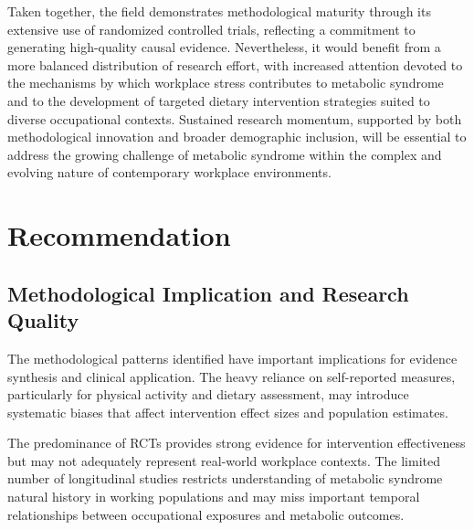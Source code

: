 Taken together, the field demonstrates methodological maturity through its extensive use of randomized controlled trials, reflecting a commitment to generating high-quality causal evidence. Nevertheless, it would benefit from a more balanced distribution of research effort, with increased attention devoted to the mechanisms by which workplace stress contributes to metabolic syndrome and to the development of targeted dietary intervention strategies suited to diverse occupational contexts. Sustained research momentum, supported by both methodological innovation and broader demographic inclusion, will be essential to address the growing challenge of metabolic syndrome within the complex and evolving nature of contemporary workplace environments.

\section{Recommendation}
\subsection{Methodological Implication and Research Quality}
The methodological patterns identified have important implications for evidence synthesis and clinical application. The heavy reliance on self-reported measures, particularly for physical activity and dietary assessment, may introduce systematic biases that affect intervention effect sizes and population estimates.
\par
The predominance of RCTs provides strong evidence for intervention effectiveness but may not adequately represent real-world workplace contexts. The limited number of longitudinal studies restricts understanding of metabolic syndrome natural history in working populations and may miss important temporal relationships between occupational exposures and metabolic outcomes.

